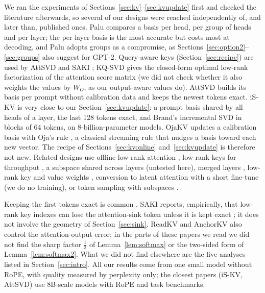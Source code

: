 \documentclass[10pt]{article}
\theoremstyle{plain}
\theoremstyle{definition}
\theoremstyle{remark}
\begin{document}
We ran the experiments of Sections~\ref{sec:kv}--\ref{sec:kvupdate} first and checked the literature afterwards, so several of our designs were reached independently of, and later than, published ones. Palu \cite{palu2025} compares a basis per head, per group of heads and per layer; the per-layer basis is the most accurate but costs most at decoding, and Palu adopts groups as a compromise, as Sections~\ref{sec:option2}--\ref{sec:groups} also suggest for GPT-2. Query-aware keys (Section~\ref{sec:recipe}) are used by AttSVD \cite{attsvd2026} and SAKI \cite{saki2026}; KQ-SVD \cite{kqsvd2025} gives the closed-form optimal low-rank factorization of the attention score matrix (we did not check whether it also weights the values by $W_O$, as our output-aware values do). AttSVD builds its basis per prompt without calibration data and keeps the newest tokens exact. iS-KV \cite{iskv2026} is very close to our Section~\ref{sec:kvupdate}: a prompt basis shared by all heads of a layer, the last 128 tokens exact, and Brand's incremental SVD in blocks of 64 tokens, on 8-billion-parameter models. OjaKV \cite{ojakv2025} updates a calibration basis with Oja's rule \cite{oja1982}, a classical streaming rule that nudges a basis toward each new vector. The recipe of Sections~\ref{sec:kvonline} and~\ref{sec:kvupdate} is therefore not new. Related designs use offline low-rank attention \cite{saxena2024eigen}, low-rank keys for throughput \cite{sun2024shadowkv}, a subspace shared across layers \cite{chang2025xkv} (untested here), merged layers \cite{liu2024minicache}, low-rank key and value weights \cite{zhang2024lorc}, conversion to latent attention \cite{deepseek2024} with a short fine-tune \cite{ji2025mha2mla,meng2025transmla} (we do no training), or token sampling with subspaces \cite{s4r2026}.

Keeping the first tokens exact is common \cite{xiao2024sinks,ojakv2025}. SAKI reports, empirically, that low-rank key indexes can lose the attention-sink token unless it is kept exact \cite{saki2026}; it does not involve the geometry of Section~\ref{sec:sink}. ReadKV \cite{readkv2026} and AnchorKV \cite{anchorkv2026} also control the attention-output error; in the parts of these papers we read we did not find the sharp factor $\tfrac12$ of Lemma~\ref{lem:softmax} or the two-sided form of Lemma~\ref{lem:softmax2}. What we did not find elsewhere are the five analyses listed in Section~\ref{sec:intro}. All our results come from one small model without RoPE, with quality measured by perplexity only; the closest papers (iS-KV, AttSVD) use 8B-scale models with RoPE and task benchmarks.
\end{document}
